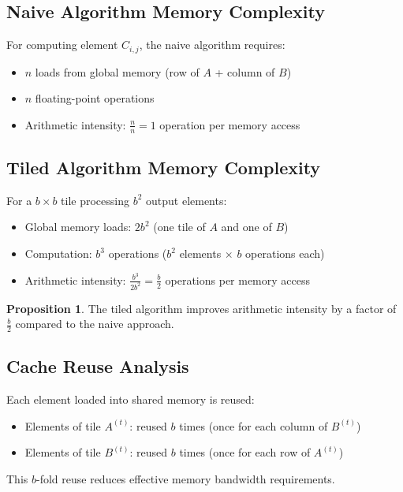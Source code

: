 \documentclass{amsbook}
\theoremstyle{definition}
\newtheorem{proposition}{Proposition}[chapter]
\begin{document}
\subsection{Naive Algorithm Memory Complexity}

For computing element $C_{i,j}$, the naive algorithm requires:
\begin{itemize}
\item $n$ loads from global memory (row of $A$ + column of $B$)
\item $n$ floating-point operations
\item Arithmetic intensity: $\frac{n}{n} = 1$ operation per memory access
\end{itemize}

\subsection{Tiled Algorithm Memory Complexity}

For a $b \times b$ tile processing $b^2$ output elements:
\begin{itemize}
\item Global memory loads: $2b^2$ (one tile of $A$ and one of $B$)
\item Computation: $b^3$ operations ($b^2$ elements $\times$ $b$ operations each)
\item Arithmetic intensity: $\frac{b^3}{2b^2} = \frac{b}{2}$ operations per memory access
\end{itemize}

\begin{proposition}
The tiled algorithm improves arithmetic intensity by a factor of $\frac{b}{2}$ compared to the naive approach.
\end{proposition}

\subsection{Cache Reuse Analysis}

Each element loaded into shared memory is reused:
\begin{itemize}
\item Elements of tile $A^{(t)}$: reused $b$ times (once for each column of $B^{(t)}$)
\item Elements of tile $B^{(t)}$: reused $b$ times (once for each row of $A^{(t)}$)
\end{itemize}

This $b$-fold reuse reduces effective memory bandwidth requirements.
\end{document}
